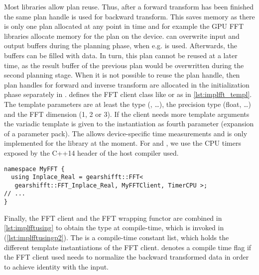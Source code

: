 Most libraries allow plan reuse. Thus, after a forward transform has been finished the same plan handle is used for backward transform. This saves memory as there is only one plan allocated at any point in time and for example the GPU FFT libraries allocate memory for the plan on the device. \fftw{} can overwrite input and output buffers during the planning phase, when e.g.  is used. Afterwards, the buffers can be filled with data. In turn, this plan cannot be reused at a later time, as the result buffer of the previous plan would be overwritten during the second planning stage. When it is not possible to reuse the plan handle, then plan handles for forward and inverse transform are allocated in the initialization phase separately in \gearshifft{}.
%
 defines the FFT client class like  or  as in \cref{lst:implfft_templ}. The template parameters are at least the  type (, \ldots), the precision type (float, \ldots) and the FFT dimension (1, 2 or 3). 
If the client needs more template arguments the variadic template  is given to the  instantiation as fourth parameter (expansion of a parameter pack).
The  allows device-specific time measurements and is only implemented for the \cufft{} library at the moment. For \fftw{} and \clfft{}, we use the CPU timers exposed by the C++14  header of the host compiler used.

\begin{lstlisting}[caption={Define FFT client types for corresponding FFTs},label={lst:implfftusing}]
namespace MyFFT { 
  using Inplace_Real = gearshifft::FFT<
   gearshifft::FFT_Inplace_Real, MyFFTClient, TimerCPU >;
// ...
}
\end{lstlisting}

Finally, the FFT client and the FFT wrapping functor are combined in \cref{lst:implfftusing} to obtain the type at compile-time, which is invoked in  (\cref{lst:implfftusingp2}). The  is a compile-time constant list, which holds the different template instantiations of the FFT client.  denotes a compile time flag if the FFT client used needs to normalize the backward transformed data in order to achieve identity with the input.


